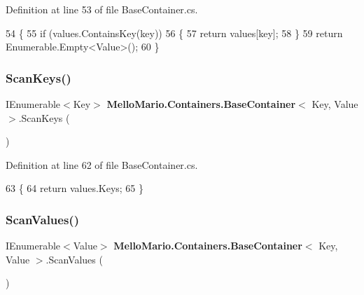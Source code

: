 Definition at line 53 of file Base\+Container.\+cs.


\begin{DoxyCode}
54         \{
55             \textcolor{keywordflow}{if} (values.ContainsKey(key))
56             \{
57                 \textcolor{keywordflow}{return} values[key];
58             \}
59             \textcolor{keywordflow}{return} Enumerable.Empty<Value>();
60         \}
\end{DoxyCode}
\mbox{\label{classMelloMario_1_1Containers_1_1BaseContainer_a7ab92dafe7bd52a060afe6bd022016ba}} 
\subsubsection{Scan\+Keys()}
{\footnotesize\ttfamily I\+Enumerable$<$Key$>$ \textbf{ Mello\+Mario.\+Containers.\+Base\+Container}$<$ Key, Value $>$.Scan\+Keys (\begin{DoxyParamCaption}{ }\end{DoxyParamCaption})\hspace{0.3cm}{\ttfamily [protected]}}



Definition at line 62 of file Base\+Container.\+cs.


\begin{DoxyCode}
63         \{
64             \textcolor{keywordflow}{return} values.Keys;
65         \}
\end{DoxyCode}
\mbox{\label{classMelloMario_1_1Containers_1_1BaseContainer_aff522bd35121081b0e224ab1444416e5}} 
\subsubsection{Scan\+Values()}
{\footnotesize\ttfamily I\+Enumerable$<$Value$>$ \textbf{ Mello\+Mario.\+Containers.\+Base\+Container}$<$ Key, Value $>$.Scan\+Values (\begin{DoxyParamCaption}{ }\end{DoxyParamCaption})\hspace{0.3cm}{\ttfamily [protected]}}



